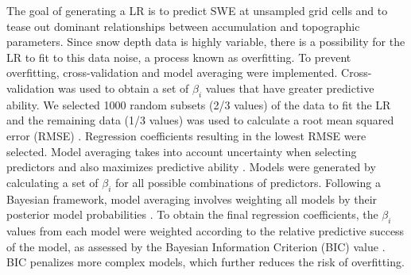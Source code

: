 \documentclass[review,oneside, letterpaper]{igs}
\begin{document}
The goal of generating a LR is to predict SWE at unsampled grid cells and to tease out dominant relationships between accumulation and topographic parameters. Since snow depth data is highly variable, there is a possibility for the LR to fit to this data noise, a process known as overfitting. To prevent overfitting, cross-validation and model averaging were implemented. Cross-validation was used to obtain a set of $\beta_i$ values that have greater predictive ability. We selected 1000 random subsets (2/3 values) of the data to fit the LR and the remaining data (1/3 values) was used to calculate a root mean squared error (RMSE) \citep{Kohavi1995}. Regression coefficients resulting in the lowest RMSE were selected. Model averaging takes into account uncertainty when selecting predictors and also maximizes predictive ability \citep{Madigan1994}. Models were generated by calculating a set of $\beta_i$ for all possible combinations of predictors. Following a Bayesian framework, model averaging involves weighting all models by their posterior model probabilities \citep{Raftery1997}. To obtain the final regression coefficients, the $\beta_i$ values from each model were weighted according to the relative predictive success of the model, as assessed by the Bayesian Information Criterion (BIC) value \citep{Burnham2004}. BIC penalizes more complex models, which further reduces the risk of overfitting.
\end{document}
